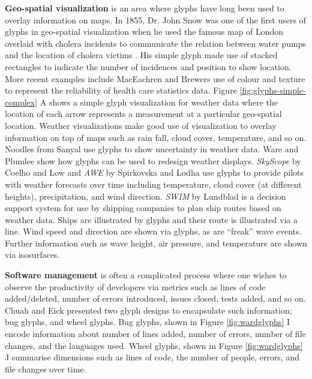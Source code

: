 \textbf{Geo-spatial visualization} is an area where glyphs have long been used to overlay information on maps. 
In 1855, Dr. John Snow was one of the first users of glyphs in geo-spatial visualization when he used the famous map of London overlaid with cholera incidents to communicate the relation between water pumps and the location of cholera victims \cite{snow1855mode}. 
His simple glyph made use of stacked rectangles to indicate the number of incidences and position to show location. 
More recent examples include MacEachren and Brewers \cite{maceachren1998visualizing} use of colour and texture to represent the reliability of health care statistics data. 
Figure \ref{fig:glyphs-simple-complex} A shows a simple glyph visualization for weather data where the location of each arrow represents a measurement at a particular geo-spatial location. 
Weather visualizations make good use of visualization to overlay information on top of maps such as rain fall, cloud cover, temperature, and so on. 
Noodles from Sanyal \etal \cite{sanyal:2010:NTEU} use glyphs to show uncertainty in weather data. 
Ware and Plumlee \cite{Ware01072013} show how glyphs can be used to redesign weather displays.
\emph{SkyScope} by Coelho and Low\cite{coelhoskyscope} and \emph{AWE} by Spirkovska and Lodha \cite{spirkovska2002awe} use glyphs to provide pilots with weather forecasts over time including temperature, cloud cover (at different heights), precipitation, and wind direction. 
\emph{SWIM} by Lundblad \etal \cite{lundblad2009interactive} is a decision support system for use by shipping companies to plan ship routes based on weather data. 
Ships are illustrated by glyphs and their route is illustrated via a line. 
Wind speed and direction are shown via glyphs, as are ``freak'' wave events. 
Further information such as wave height, air pressure, and temperature are shown via isosurfaces. 

\textbf{Software management} is often a complicated process where one wishes to observe the productivity of developers via metrics such as lines of code added/deleted, number of errors introduced, issues closed, tests added, and so on. 
Chuah and Eick \cite{chuah1998} presented two glyph designs to encapsulate such information; bug glyphs, and wheel glyphs. 
Bug glyphs, shown in Figure \ref{fig:wardglyphs} I encode information about number of lines added, number of errors, number of file changes, and the languages used.
Wheel glyphs, shown in Figure \ref{fig:wardglyphs} J summarise dimensions such as lines of code, the number of people, errors, and file changes over time.

